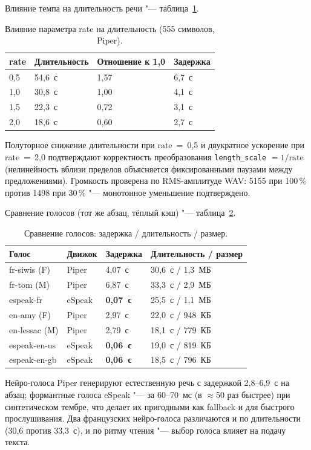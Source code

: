 Влияние темпа на длительность речи "--- таблица~\ref{tab:tts_rate}.

\begin{table}[H]
	\caption{Влияние параметра rate на длительность (555 символов, Piper).}
	\label{tab:tts_rate}
	\begin{tabular}{|l|l|l|l|}
		\hline
		rate & Длительность & Отношение к 1,0 & Задержка \\ \hline
		0,5 & 54,6~с & 1,57 & 6,7~с \\
		1,0 & 30,8~с & 1,00 & 4,1~с \\
		1,5 & 22,3~с & 0,72 & 3,1~с \\
		2,0 & 18,6~с & 0,60 & 2,7~с \\ \hline
	\end{tabular}
\end{table}

Полуторное снижение длительности при rate~=~0,5 и двукратное ускорение
при rate~=~2,0 подтверждают корректность преобразования
\texttt{length\_scale} $= 1/\text{rate}$ (нелинейность вблизи пределов
объясняется фиксированными паузами между предложениями).
Громкость проверена по RMS-амплитуде WAV: 5155 при 100\,\%
против 1498 при 30\,\% "--- монотонное уменьшение подтверждено.

Сравнение голосов (тот же абзац, тёплый кэш) "--- таблица~\ref{tab:tts_voices}.

\begin{table}[H]
	\caption{Сравнение голосов: задержка / длительность / размер.}
	\label{tab:tts_voices}
	\begin{tabular}{|l|l|l|l|}
		\hline
		Голос & Движок & Задержка & Длительность / размер \\ \hline
		fr-siwis (F) & Piper & 4,07~с & 30,6~с / 1,3~МБ \\
		fr-tom (M) & Piper & 6,87~с & 33,3~с / 2,9~МБ \\
		espeak-fr & eSpeak & \textbf{0,07~с} & 25,5~с / 1,1~МБ \\ \hline
		en-amy (F) & Piper & 2,97~с & 22,0~с / 948~КБ \\
		en-lessac (M) & Piper & 2,79~с & 18,1~с / 779~КБ \\
		espeak-en-us & eSpeak & \textbf{0,06~с} & 19,0~с / 819~КБ \\
		espeak-en-gb & eSpeak & \textbf{0,06~с} & 18,5~с / 796~КБ \\ \hline
	\end{tabular}
\end{table}

Нейро-голоса Piper генерируют естественную речь с задержкой
2,8--6,9~с на абзац; формантные голоса eSpeak "--- за 60--70~мс
(в $\approx$50 раз быстрее) при синтетическом тембре, что делает их
пригодными как fallback и для быстрого прослушивания.
Два французских нейро-голоса различаются и по длительности
(30,6 против 33,3~с), и по ритму чтения "--- выбор голоса влияет
на подачу текста.

